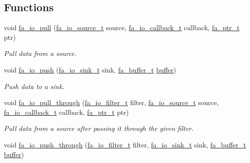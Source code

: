 \subsection*{Functions}
\begin{DoxyCompactItemize}
\item 
void \hyperlink{group___fa_io_ga3d6948a08503213c1c48beab1938e7b1}{fa\-\_\-io\-\_\-pull} (\hyperlink{group___fa_io_ga95a53a87c83414434e1afd3097b96ea4}{fa\-\_\-io\-\_\-source\-\_\-t} source, \hyperlink{group___fa_io_gaa151f2c484756349795513fdf67a0268}{fa\-\_\-io\-\_\-callback\-\_\-t} callback, \hyperlink{group___fa_ga915ddeae99ad7568b273d2b876425197}{fa\-\_\-ptr\-\_\-t} ptr)
\begin{DoxyCompactList}\small\item\em Pull data from a source. \end{DoxyCompactList}\item 
void \hyperlink{group___fa_io_ga37b29056c1f719c9a4d4cd1ef11e2584}{fa\-\_\-io\-\_\-push} (\hyperlink{group___fa_io_ga0d00d1e2c742abdba97597662815ce3a}{fa\-\_\-io\-\_\-sink\-\_\-t} sink, \hyperlink{group___fa_buffer_ga0ed7a1d783ab322e2e8be02432d0839e}{fa\-\_\-buffer\-\_\-t} \hyperlink{util_8h_ad0c623e8b04565926f5b48888327724a}{buffer})
\begin{DoxyCompactList}\small\item\em Push data to a sink. \end{DoxyCompactList}\item 
void \hyperlink{group___fa_io_ga249b3427c89eaf4fff61ea26582c6977}{fa\-\_\-io\-\_\-pull\-\_\-through} (\hyperlink{group___fa_io_ga3e1f11810efcba3b45842e10c1425aba}{fa\-\_\-io\-\_\-filter\-\_\-t} filter, \hyperlink{group___fa_io_ga95a53a87c83414434e1afd3097b96ea4}{fa\-\_\-io\-\_\-source\-\_\-t} source, \hyperlink{group___fa_io_gaa151f2c484756349795513fdf67a0268}{fa\-\_\-io\-\_\-callback\-\_\-t} callback, \hyperlink{group___fa_ga915ddeae99ad7568b273d2b876425197}{fa\-\_\-ptr\-\_\-t} ptr)
\begin{DoxyCompactList}\small\item\em Pull data from a source after passing it through the given filter. \end{DoxyCompactList}\item 
void \hyperlink{group___fa_io_ga468831a94c4cdda4769a09a92fcae3ca}{fa\-\_\-io\-\_\-push\-\_\-through} (\hyperlink{group___fa_io_ga3e1f11810efcba3b45842e10c1425aba}{fa\-\_\-io\-\_\-filter\-\_\-t} filter, \hyperlink{group___fa_io_ga0d00d1e2c742abdba97597662815ce3a}{fa\-\_\-io\-\_\-sink\-\_\-t} sink, \hyperlink{group___fa_buffer_ga0ed7a1d783ab322e2e8be02432d0839e}{fa\-\_\-buffer\-\_\-t} \hyperlink{util_8h_ad0c623e8b04565926f5b48888327724a}{buffer})

\end{DoxyCompactItemize}
